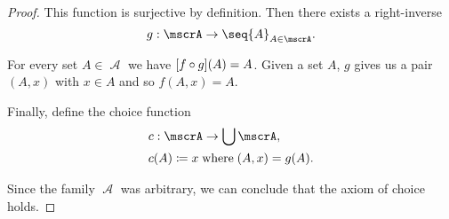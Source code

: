 \begin{proof}
  This function is surjective by definition. Then there exists a right-inverse
  \begin{equation*}
    g: \mscrA \to \seq{ A }_{A \in \mscrA}.
  \end{equation*}

  For every set \( A \in \mscrA \) we have \( [f \bincirc g](A) = A \). Given a set \( A \), \( g \) gives us a pair \( (A, x) \) with \( x \in A \) and so \( f(A, x) = A \).

  Finally, define the choice function
  \begin{equation*}
    \begin{aligned}
      &c: \mscrA \to \bigcup \mscrA, \\
      &c(A) \coloneqq x \T{where} (A, x) = g(A).
    \end{aligned}
  \end{equation*}

  Since the family \( \mscrA \) was arbitrary, we can conclude that the axiom of choice holds.
\end{proof}

